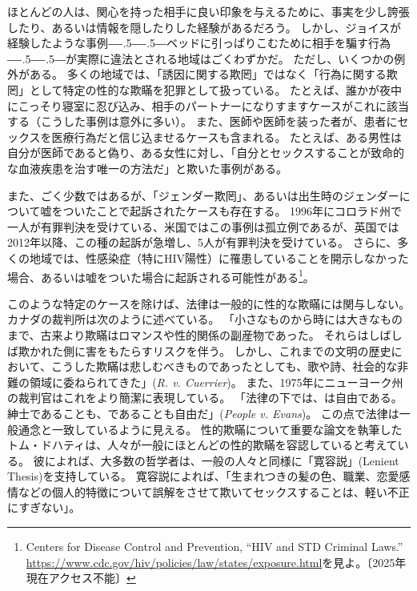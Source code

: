 \documentclass[paper=a4,book,openany]{jlreq}
\def\DDASH{―\kern-.5\zw―\kern-.5\zw―} %
\begin{document}
ほとんどの人は、関心を持った相手に良い印象を与えるために、事実を少し誇張したり、あるいは情報を隠したりした経験があるだろう。
しかし、ジョイスが経験したような事例{\DDASH}ベッドに引っぱりこむために相手を騙す行為{\DDASH}が実際に違法とされる地域はごくわずかだ。
ただし、いくつかの例外がある。
多くの地域では、「誘因に関する欺罔」ではなく「行為に関する欺罔」として特定の性的な欺瞞を犯罪として扱っている。
たとえば、誰かが夜中にこっそり寝室に忍び込み、相手のパートナーになりすますケースがこれに該当する（こうした事例は意外に多い）。
また、医師や医師を装った者が、患者にセックスを医療行為だと信じ込ませるケースも含まれる。
たとえば、ある男性は自分が医師であると偽り、ある女性に対し、「自分とセックスすることが致命的な血液疾患を治す唯一の方法だ」と欺いた事例がある\citep{chavez87:_woman_says_ruse_trick_her_sex}。

また、ごく少数ではあるが、「ジェンダー欺罔」、あるいは出生時のジェンダーについて嘘をついたことで起訴されたケースも存在する。
1996年にコロラド州で一人が有罪判決を受けている、米国ではこの事例は孤立例であるが、英国では2012年以降、この種の起訴が急増し、5人が有罪判決を受けている\citep{wilkinson17:_troub_case_uk_woman_convic_gender_fraud}。
さらに、多くの地域では、性感染症（特にHIV陽性）に罹患していることを開示しなかった場合、あるいは嘘をついた場合に起訴される可能性がある\footnote{Centers for Disease Control and Prevention, ``HIV and STD Criminal Laws.'' \url{https://www.cdc.gov/hiv/policies/law/states/exposure.html}を見よ。〔2025年現在アクセス不能〕}。

このような特定のケースを除けば、法律は一般的に性的な欺瞞には関与しない。
カナダの裁判所は次のように述べている。
「小さなものから時には大きなものまで、古来より欺瞞はロマンスや性的関係の副産物であった。
それらはしばしば欺かれた側に害をもたらすリスクを伴う。
しかし、これまでの文明の歴史において、こうした欺瞞は悲しむべきものであったとしても、歌や詩、社会的な非難の領域に委ねられてきた」(\emph{R. v. Cuerrier})。
また、1975年にニューヨーク州の裁判官はこれをより簡潔に表現している。
「法律の下では、は自由である。
紳士であることも、であることも自由だ」(\emph{People v. Evans})。
この点で法律は一般通念と一致しているように見える。
性的欺瞞について重要な論文を執筆したトム・ドハティは、人々が一般にほとんどの性的欺瞞を容認していると考えている。
彼によれば、大多数の哲学者は、一般の人々と同様に「寛容説」(Lenient Thesis)を支持している。
寛容説によれば、「生まれつきの髪の色、職業、恋愛感情などの個人的特徴について誤解をさせて欺いてセックスすることは、軽い不正にすぎない」\citep[p.718]{dougherty13:_sex_lies_consen}。
\end{document}
